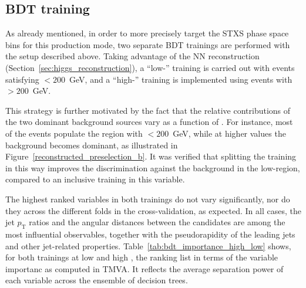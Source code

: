 \subsection{BDT training}

As already mentioned, in order to more precisely target the STXS phase space bins for this \ttH production mode, two separate BDT trainings are performed with the setup described above. Taking advantage of the NN \pth reconstruction (Section~\ref{sec:higgs_reconstruction}), a ``low-\pth'' training is carried out with events satisfying \pth$<200$~GeV, and a ``high-\pth'' training is implemented using events with \pth$>200$~GeV.  

This strategy is further motivated by the fact that the relative contributions of the two dominant background sources vary as a function of \pth. For instance, most of the \ttbar events populate the region with \pth$<200$~GeV, while at higher values the \ztautau background becomes dominant, as illustrated in Figure~\ref{reconstructed_preselection_b}. It was verified that splitting the training in this way improves the discrimination against the \ttbar background in the low-\pth region, compared to an inclusive training in this variable.

The highest ranked variables in both trainings do not vary significantly, nor do they across the different folds in the cross-validation, as expected. In all cases, the jet $p_{\text{T}}$ ratios and the angular distances between the \tauhadvis candidates are among the most influential observables, together with the pseudorapidity of the leading jets and other jet-related properties. Table~\ref{tab:bdt_importance_high_low} shows, for both trainings at low and high \pth, the ranking list in terms of the variable importanc as computed in TMVA. It reflects the average separation power of each variable across the ensemble of decision trees.

